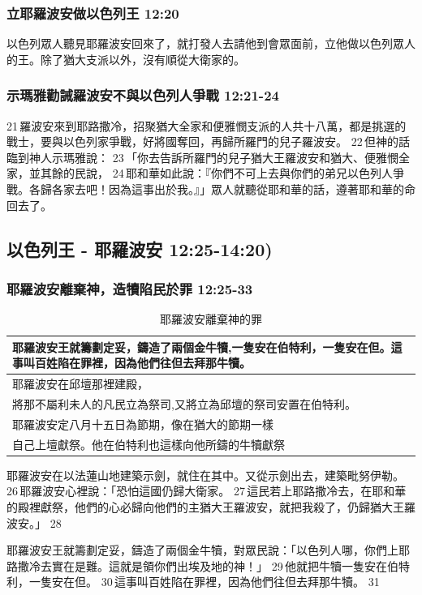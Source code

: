 \subsubsection{立耶羅波安做以色列王 12:20}
以色列眾人聽見耶羅波安回來了，就打發人去請他到會眾面前，立他做以色列眾人的王。除了猶大支派以外，沒有順從大衛家的。

\subsubsection{示瑪雅勸誡羅波安不與以色列人爭戰 12:21-24}
21 羅波安來到耶路撒冷，招聚猶大全家和便雅憫支派的人共十八萬，都是挑選的戰士，要與以色列家爭戰，好將國奪回，再歸所羅門的兒子羅波安。 22 但神的話臨到神人示瑪雅說： 23 「你去告訴所羅門的兒子猶大王羅波安和猶大、便雅憫全家，並其餘的民說， 24 耶和華如此說：『你們不可上去與你們的弟兄以色列人爭戰。各歸各家去吧！因為這事出於我。』」眾人就聽從耶和華的話，遵著耶和華的命回去了。

\subsection{以色列王 - 耶羅波安 12:25-14:20)}
\subsubsection{耶羅波安離棄神，造犢陷民於罪 12:25-33}
\begin{table}[!hbp]
\centering 
\begin{tabular}{|p{13cm}|}
\hline
\hline
耶羅波安王就籌劃定妥，鑄造了兩個金牛犢,一隻安在伯特利，一隻安在但。這事叫百姓陷在罪裡，因為他們往但去拜那牛犢。\\\hline
耶羅波安在邱壇那裡建殿，\\\hline
將那不屬利未人的凡民立為祭司,又將立為邱壇的祭司安置在伯特利。\\\hline
耶羅波安定八月十五日為節期，像在猶大的節期一樣\\\hline
自己上壇獻祭。他在伯特利也這樣向他所鑄的牛犢獻祭\\\hline
\end{tabular}
\caption{耶羅波安離棄神的罪}
\end{table}
耶羅波安在以法蓮山地建築示劍，就住在其中。又從示劍出去，建築毗努伊勒。 26 耶羅波安心裡說：「恐怕這國仍歸大衛家。 27 這民若上耶路撒冷去，在耶和華的殿裡獻祭，他們的心必歸向他們的主猶大王羅波安，就把我殺了，仍歸猶大王羅波安。」 28 

耶羅波安王就籌劃定妥，鑄造了兩個金牛犢，對眾民說：「以色列人哪，你們上耶路撒冷去實在是難。這就是領你們出埃及地的神！」 29 他就把牛犢一隻安在伯特利，一隻安在但。 30 這事叫百姓陷在罪裡，因為他們往但去拜那牛犢。 31 

